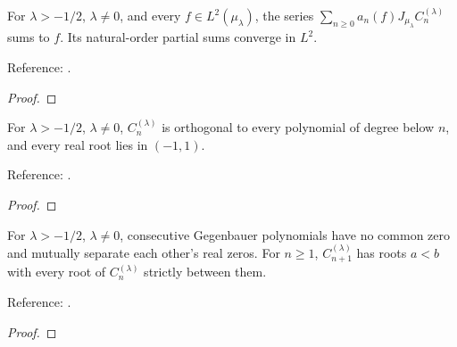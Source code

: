 \begin{theorem}
\label{thm:gegenbauer-L2-expansion}
\leanok
For $\lambda>-1/2$, $\lambda\ne0$, and every $f\in L^2(\mu_\lambda)$,
the series $\sum_{n\ge0}a_n(f)J_{\mu_\lambda}C_n^{(\lambda)}$ sums to $f$.
Its natural-order partial sums converge in $L^2$.

Reference: \cite[18.2(viii)]{dlmf}.
\end{theorem}
\begin{proof}
\leanok
\end{proof}

\begin{theorem}
\label{thm:gegenbauer-root-location}
\leanok
For $\lambda>-1/2$, $\lambda\ne0$, $C_n^{(\lambda)}$ is orthogonal to every
polynomial of degree below $n$, and every real root lies in $(-1,1)$.

Reference: \cite[18.2(i), (vi)]{dlmf}.
\end{theorem}
\begin{proof}
\leanok
\end{proof}

\begin{theorem}
\label{thm:gegenbauer-interlacing}
\leanok
For $\lambda>-1/2$, $\lambda\ne0$, consecutive Gegenbauer polynomials have
no common zero and mutually separate each other's real zeros.
For $n\ge1$, $C_{n+1}^{(\lambda)}$ has roots $a<b$ with every root of
$C_n^{(\lambda)}$ strictly between them.

Reference: \cite[18.2(vi)]{dlmf}.
\end{theorem}
\begin{proof}
\leanok
\end{proof}

